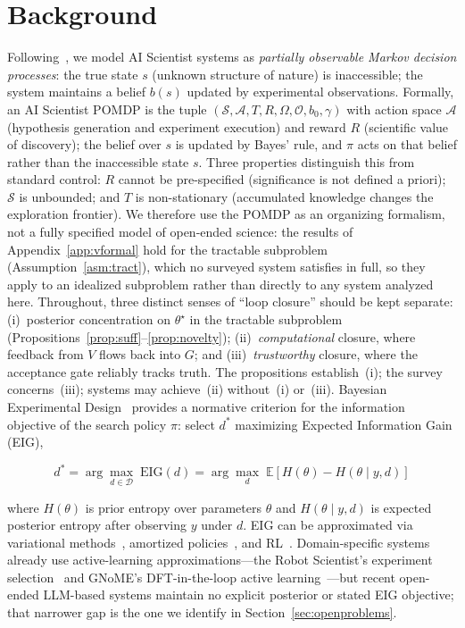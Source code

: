 \documentclass{article}
\begin{document}
\section{Background}
\label{sec:background}

Following~\citet{kaelbling1998pomdp}, we model AI Scientist systems as \emph{partially observable Markov decision processes}: the true state $s$ (unknown structure of nature) is inaccessible; the system maintains a belief $b(s)$ updated by experimental observations. Formally, an AI Scientist POMDP is the tuple $(\mathcal{S}, \mathcal{A}, T, R, \Omega, \mathcal{O}, b_0, \gamma)$ with action space $\mathcal{A}$ (hypothesis generation and experiment execution) and reward $R$ (scientific value of discovery); the belief over $s$ is updated by Bayes' rule, and $\pi$ acts on that belief rather than the inaccessible state $s$. Three properties distinguish this from standard control: $R$ cannot be pre-specified (significance is not defined a priori); $\mathcal{S}$ is unbounded; and $T$ is non-stationary (accumulated knowledge changes the exploration frontier). We therefore use the POMDP as an organizing formalism, not a fully specified model of open-ended science: the results of Appendix~\ref{app:vformal} hold for the tractable subproblem (Assumption~\ref{asm:tract}), which no surveyed system satisfies in full, so they apply to an idealized subproblem rather than directly to any system analyzed here. Throughout, three distinct senses of ``loop closure'' should be kept separate: (i)~posterior concentration on $\theta^\star$ in the tractable subproblem (Propositions~\ref{prop:suff}--\ref{prop:novelty}); (ii)~\emph{computational} closure, where feedback from $V$ flows back into $G$; and (iii)~\emph{trustworthy} closure, where the acceptance gate reliably tracks truth. The propositions establish~(i); the survey concerns~(iii); systems may achieve~(ii) without~(i) or~(iii). Bayesian Experimental Design~\citep{chaloner1995bayesian,rainforth2024modern} provides a normative criterion for the information objective of the search policy $\pi$: select $d^*$ maximizing Expected Information Gain (EIG),

\begin{equation}
  d^* = \arg\max_{d \in \mathcal{D}}\; \mathrm{EIG}(d) = \arg\max_{d}\; \mathbb{E}\left[H(\theta) - H(\theta \mid y, d)\right]
  \label{eq:eid}
\end{equation}

where $H(\theta)$ is prior entropy over parameters $\theta$ and $H(\theta \mid y, d)$ is expected posterior entropy after observing $y$ under $d$. EIG can be approximated via variational methods~\citep{foster2019variational}, amortized policies~\citep{foster2021dad}, and RL~\citep{blau2022rl}. Domain-specific systems already use active-learning approximations---the Robot Scientist's experiment selection~\citep{king2004robot} and GNoME's DFT-in-the-loop active learning~\citep{merchant2023gnome}---but recent open-ended LLM-based systems maintain no explicit posterior or stated EIG objective; that narrower gap is the one we identify in Section~\ref{sec:openproblems}.
\end{document}

